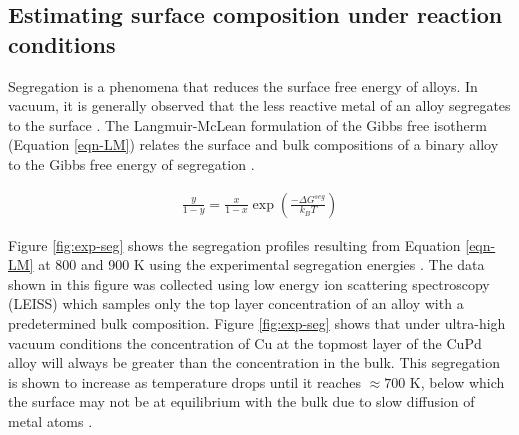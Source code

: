 \documentclass[12pt]{cmuthesis}
\begin{document}
\subsection{Estimating surface composition under reaction conditions}
\label{sec:orgf9ecae3}
Segregation is a phenomena that reduces the surface free energy of alloys. In vacuum, it is generally observed that the less reactive metal of an alloy segregates to the surface \cite{ruban-1999-surfac-segreg,ruban-2007-theor-inves}. The Langmuir-McLean formulation of the Gibbs free isotherm (Equation \eqref{eqn-LM}) relates the surface and bulk compositions of a binary alloy to the Gibbs free energy of segregation \cite{miller-2008-surfac-segreg}.

\begin{eqnarray}
\frac{y}{1-y} = \frac{x}{1-x} \exp\left(\frac{-\Delta G^{seg}}{k_{B}T}\right)
\label{eqn-LM}
\end{eqnarray}

Figure \ref{fig:exp-seg} shows the segregation profiles resulting from Equation \eqref{eqn-LM} at 800 and 900 K using the experimental segregation energies \cite{priyadarshini-2011-high-throug}. The data shown in this figure was collected using low energy ion scattering spectroscopy (LEISS) which samples only the top layer concentration of an alloy with a predetermined bulk composition. Figure \ref{fig:exp-seg} shows that under ultra-high vacuum conditions the concentration of Cu at the topmost layer of the CuPd alloy will always be greater than the concentration in the bulk. This segregation is shown to increase as temperature drops until it reaches \(\approx 700\) K, below which the surface may not be at equilibrium with the bulk due to slow diffusion of metal atoms \cite{miller-2008-surfac-segreg}.
\end{document}
